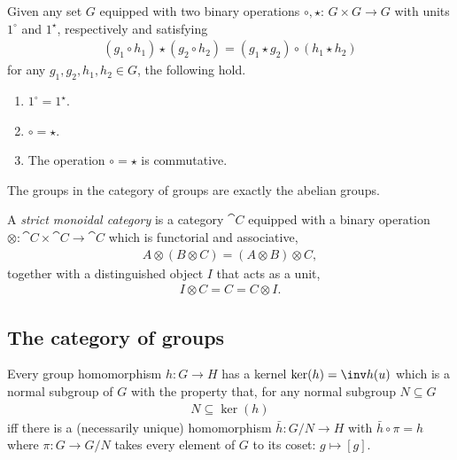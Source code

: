 \documentclass{article}
\begin{document}
\begin{proposition}[Awodey p. 78]
	Given any set $G$ equipped with two binary operations $\circ,\star$:
	$G\times G\to G$ with units $1^\circ$ and $1^\star$, respectively and
	satisfying
	\begin{align*}
		(g_1 \circ h_1)\star (g_2\circ h_2) = (g_1\star g_2) \circ (h_1\star h_2)
	\end{align*}
	for any $g_1, g_2, h_1, h_2\in G$, the following hold.
	\begin{enumerate}
		\item $1^\circ = 1^\star$.
		\item $\circ = \star$.
		\item The operation $\circ = \star$ is commutative.
	\end{enumerate}
\end{proposition}

\begin{corollary}[Awodey p. 79]
	The groups in the category of groups are exactly the abelian groups.
\end{corollary}

\begin{definition}[Awodey p. 79]
	A \emph{strict monoidal category} is a category $\cat C$ equipped with a
	binary operation $\otimes:\cat C\times \cat C\to \cat C$ which is functorial
	and associative,
	\begin{align*}
		A\otimes(B\otimes C) = (A\otimes B)\otimes C,
	\end{align*}
	together with a distinguished object $I$ that acts as a unit,
	\begin{align*}
		I\otimes C = C = C \otimes I.
	\end{align*}
\end{definition}

\subsection{The category of groups}

\begin{theorem}[Awodey p. 83]
	Every group homomorphism $h:G\to H$ has a kernel $\ker(h)=\inv h(u)$
	which is a normal subgroup of $G$ with the property that, for any normal
	subgroup $N\subseteq G$
	\begin{align*}
		N\subseteq \ker(h)
	\end{align*}
	iff there is a (necessarily unique) homomorphism
	$\bar h:G/N\to H$ with $\bar h \circ \pi = h$ where
	$\pi:G\to G/N$ takes every element of $G$ to its
	coset: $g\mapsto [g]$.
\end{theorem}
\end{document}
